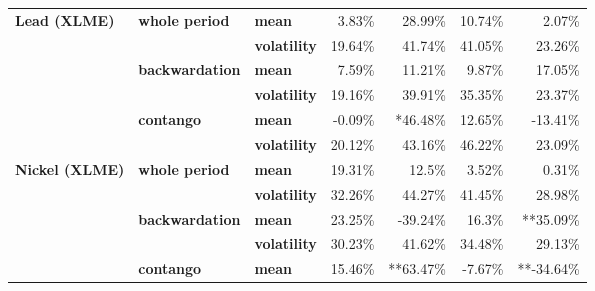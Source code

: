 \documentclass[
  authoryear,
  preprint,
  3p]{elsarticle}
\begin{document}
\begin{longtable}[t]{>{}l>{}l>{}l>{}r>{}r>{}r>{}r}
\textbf{Lead (XLME)} & \textbf{whole period} & \textbf{mean} & \textcolor[HTML]{4285f4}{3.83\%} & \textcolor[HTML]{4285f4}{28.99\%} & \textcolor[HTML]{4285f4}{10.74\%} & \textcolor[HTML]{4285f4}{2.07\%}\\
\textbf{} & \textbf{} & \textbf{volatility} & \textcolor[HTML]{4285f4}{19.64\%} & \textcolor[HTML]{4285f4}{41.74\%} & \textcolor[HTML]{4285f4}{41.05\%} & \textcolor[HTML]{4285f4}{23.26\%}\\
\textbf{} & \textbf{backwardation} & \textbf{mean} & \textcolor[HTML]{4285f4}{7.59\%} & \textcolor[HTML]{4285f4}{11.21\%} & \textcolor[HTML]{4285f4}{9.87\%} & \textcolor[HTML]{4285f4}{17.05\%}\\
\textbf{} & \textbf{} & \textbf{volatility} & \textcolor[HTML]{4285f4}{19.16\%} & \textcolor[HTML]{4285f4}{39.91\%} & \textcolor[HTML]{4285f4}{35.35\%} & \textcolor[HTML]{4285f4}{23.37\%}\\
\addlinespace
\textbf{} & \textbf{contango} & \textbf{mean} & \textcolor[HTML]{4285f4}{-0.09\%} & \textcolor[HTML]{4285f4}{*46.48\%} & \textcolor[HTML]{4285f4}{12.65\%} & \textcolor[HTML]{4285f4}{-13.41\%}\\
\textbf{} & \textbf{} & \textbf{volatility} & \textcolor[HTML]{4285f4}{20.12\%} & \textcolor[HTML]{4285f4}{43.16\%} & \textcolor[HTML]{4285f4}{46.22\%} & \textcolor[HTML]{4285f4}{23.09\%}\\
\textbf{Nickel (XLME)} & \textbf{whole period} & \textbf{mean} & \textcolor[HTML]{4285f4}{19.31\%} & \textcolor[HTML]{4285f4}{12.5\%} & \textcolor[HTML]{4285f4}{3.52\%} & \textcolor[HTML]{4285f4}{0.31\%}\\
\textbf{} & \textbf{} & \textbf{volatility} & \textcolor[HTML]{4285f4}{32.26\%} & \textcolor[HTML]{4285f4}{44.27\%} & \textcolor[HTML]{4285f4}{41.45\%} & \textcolor[HTML]{4285f4}{28.98\%}\\
\textbf{} & \textbf{backwardation} & \textbf{mean} & \textcolor[HTML]{4285f4}{23.25\%} & \textcolor[HTML]{4285f4}{-39.24\%} & \textcolor[HTML]{4285f4}{16.3\%} & \textcolor[HTML]{4285f4}{**35.09\%}\\
\addlinespace
\textbf{} & \textbf{} & \textbf{volatility} & \textcolor[HTML]{4285f4}{30.23\%} & \textcolor[HTML]{4285f4}{41.62\%} & \textcolor[HTML]{4285f4}{34.48\%} & \textcolor[HTML]{4285f4}{29.13\%}\\
\textbf{} & \textbf{contango} & \textbf{mean} & \textcolor[HTML]{4285f4}{15.46\%} & \textcolor[HTML]{4285f4}{**63.47\%} & \textcolor[HTML]{4285f4}{-7.67\%} & \textcolor[HTML]{4285f4}{**-34.64\%}\\

\end{longtable}
\end{document}
